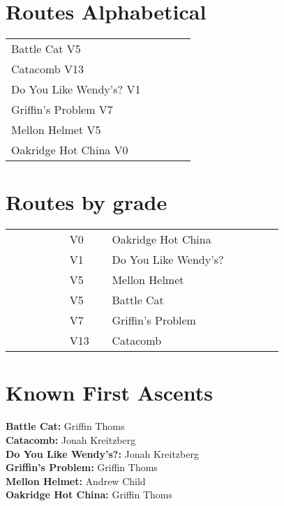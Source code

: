 \begin{flushleft}

\needspace{1.5cm}
\section{Routes Alphabetical}
\begin{center}
\begin{supertabular}{p{0.76\linewidth}p{0.08\linewidth}}
Battle Cat V5 & \pageref{rt:Battle Cat} \\
Catacomb V13 & \pageref{rt:Catacomb} \\
Do You Like Wendy's? V1 & \pageref{vr:Do You Like Wendy's?} \\
Griffin's Problem V7 & \pageref{rt:Griffin's Problem} \\
Mellon Helmet V5 & \pageref{rt:Mellon Helmet} \\
Oakridge Hot China V0 & \pageref{rt:Oakridge Hot China} \\
\end{supertabular}
\end{center}
\needspace{1.5cm}
\section{Routes by grade}
\begin{center}
\begin{supertabular}{p{0.18\linewidth}p{0.13\linewidth}p{0.45\linewidth}p{0.08\linewidth}}
 &V0&Oakridge Hot China & \pageref{rt:Oakridge Hot China} \\
 &V1&Do You Like Wendy's? & \pageref{vr:Do You Like Wendy's?} \\
 &V5&Mellon Helmet & \pageref{rt:Mellon Helmet} \\
 &V5&Battle Cat & \pageref{rt:Battle Cat} \\
 &V7&Griffin's Problem & \pageref{rt:Griffin's Problem} \\
 &V13&Catacomb & \pageref{rt:Catacomb} \\
\end{supertabular}
\end{center}
\section{Known First Ascents}
\textbf{Battle Cat:} Griffin Thoms\\
\textbf{Catacomb:} Jonah Kreitzberg\\
\textbf{Do You Like Wendy's?:} Jonah Kreitzberg\\
\textbf{Griffin's Problem:} Griffin Thoms\\
\textbf{Mellon Helmet:} Andrew Child\\
\textbf{Oakridge Hot China:} Griffin Thoms\\
\end{flushleft}
\onecolumn
\clearpage